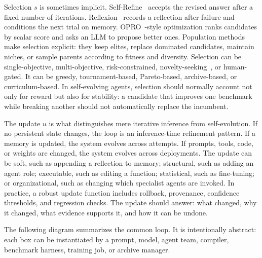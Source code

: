 Selection $s$ is sometimes implicit.  Self-Refine~\cite{selfrefine2023} accepts the revised answer after a fixed number of iterations.  Reflexion~\cite{reflexion2023} records a reflection after failure and conditions the next trial on memory.  OPRO~\cite{opro2023}-style optimization ranks candidates by scalar score and asks an LLM to propose better ones.  Population methods make selection explicit: they keep elites, replace dominated candidates, maintain niches, or sample parents according to fitness and diversity.  Selection can be single-objective, multi-objective, risk-constrained, novelty-seeking~\cite{lehman2011abandoning}, or human-gated.  It can be greedy, tournament-based, Pareto-based, archive-based, or curriculum-based.  In self-evolving agents, selection should normally account not only for reward but also for stability: a candidate that improves one benchmark while breaking another should not automatically replace the incumbent.

The update $u$ is what distinguishes mere iterative inference from self-evolution.  If no persistent state changes, the loop is an inference-time refinement pattern.  If a memory is updated, the system evolves across attempts.  If prompts, tools, code, or weights are changed, the system evolves across deployments.  The update can be soft, such as appending a reflection to memory; structural, such as adding an agent role; executable, such as editing a function; statistical, such as fine-tuning; or organizational, such as changing which specialist agents are invoked.  In practice, a robust update function includes rollback, provenance, confidence thresholds, and regression checks.  The update should answer: what changed, why it changed, what evidence supports it, and how it can be undone.

The following diagram summarizes the common loop.  It is intentionally abstract: each box can be instantiated by a prompt, model, agent team, compiler, benchmark harness, training job, or archive manager.

